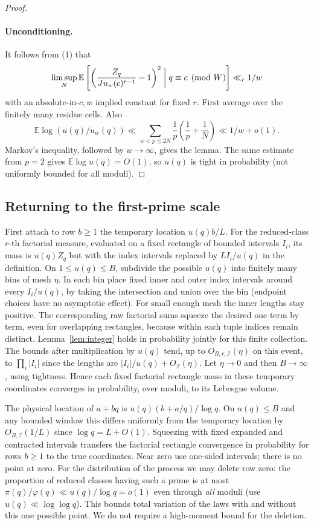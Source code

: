 \documentclass[11pt]{article}
\newcommand{\E}{\mathbb E}
\newcommand{\1}{\mathbf{1}}
\newcommand{\ph}{\varphi}
\begin{document}
\begin{proof}
\paragraph{Unconditioning.}
It follows from (1) that
\[
 \limsup_N\E\left[\left(\frac{Z_q}{J u_w(c)^{r-1}}-1\right)^2\biggm|q\equiv c\pmod W\right]
 \ll_r 1/w
\]
with an absolute-in-$c,w$ implied constant for fixed $r$. First average over the finitely many residue cells. Also
\[
 \E\log(u(q)/u_w(q))\ll \sum_{w<p\le2N}\frac1p\left(\frac1p+\frac1N\right)
 \ll 1/w+o(1).
\]
Markov's inequality, followed by $w\to\infty$, gives the lemma. The same estimate from $p=2$ gives $\E\log u(q)=O(1)$, so $u(q)$ is tight in probability (not uniformly bounded for all moduli).
\end{proof}
\subsection{Returning to the first-prime scale}
First attach to row $b\ge1$ the temporary location $u(q)b/L$. For the reduced-class $r$-th factorial measure, evaluated on a fixed rectangle of bounded intervals $I_i$, its mass is $u(q) Z_q$ but with the index intervals replaced by $L I_i/u(q)$ in the definition. On $1\le u(q)\le B$, subdivide the possible $u(q)$ into finitely many bins of mesh $\eta$. In each bin place fixed inner and outer index intervals around every $I_i/u(q)$, by taking the intersection and union over the bin (endpoint choices have no asymptotic effect). For small enough mesh the inner lengths stay positive. The corresponding raw factorial sums squeeze the desired one term by term, even for overlapping rectangles, because within each tuple indices remain distinct. Lemma~\ref{lem:integer} holds in probability jointly for this finite collection. The bounds after multiplication by $u(q)$ tend, up to $O_{B,r,\mathcal I}(\eta)$ on this event, to $\prod_i|I_i|$ since the lengths are $|I_i|/u(q)+O_{\mathcal I}(\eta)$. Let $\eta\to0$ and then $B\to\infty$, using tightness. Hence each fixed factorial rectangle mass in these temporary coordinates converges in probability, over moduli, to its Lebesgue volume.

The physical location of $a+bq$ is $u(q)(b+a/q)/\log q$. On $u(q)\le B$ and any bounded window this differs uniformly from the temporary location by $O_{B,\mathcal I}(1/L)$ since $\log q=L+O(1)$. Squeezing with fixed expanded and contracted intervals transfers the factorial rectangle convergence in probability for rows $b\ge1$ to the true coordinates. Near zero use one-sided intervals; there is no point at zero. For the distribution of the process we may delete row zero: the proportion of reduced classes having such a prime is at most $\pi(q)/\ph(q)\ll u(q)/\log q=o(1)$ even through \emph{all} moduli (use $u(q)\ll\log\log q$). This bounds total variation of the laws with and without this one possible point. We do not require a high-moment bound for the deletion.
\end{document}
